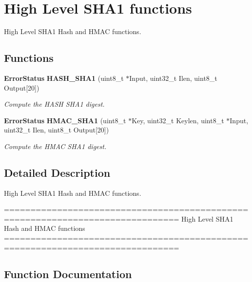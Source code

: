 \section{High Level S\+H\+A1 functions}
\label{group__HASH__Group6}


High Level S\+H\+A1 Hash and H\+M\+AC functions.  


\subsection*{Functions}
\begin{DoxyCompactItemize}
\item 
\textbf{ Error\+Status} \textbf{ H\+A\+S\+H\+\_\+\+S\+H\+A1} (uint8\+\_\+t $\ast$Input, uint32\+\_\+t Ilen, uint8\+\_\+t Output[20])
\begin{DoxyCompactList}\small\item\em Compute the H\+A\+SH S\+H\+A1 digest. \end{DoxyCompactList}\item 
\textbf{ Error\+Status} \textbf{ H\+M\+A\+C\+\_\+\+S\+H\+A1} (uint8\+\_\+t $\ast$Key, uint32\+\_\+t Keylen, uint8\+\_\+t $\ast$Input, uint32\+\_\+t Ilen, uint8\+\_\+t Output[20])
\begin{DoxyCompactList}\small\item\em Compute the H\+M\+AC S\+H\+A1 digest. \end{DoxyCompactList}\end{DoxyCompactItemize}


\subsection{Detailed Description}
High Level S\+H\+A1 Hash and H\+M\+AC functions. 

\begin{DoxyVerb} ===============================================================================
                          High Level SHA1 Hash and HMAC functions
 ===============================================================================\end{DoxyVerb}
 

\subsection{Function Documentation}
\mbox{\label{group__HASH__Group6_ga2728c02c36de6d800e1ede56ea7789cb}} 
